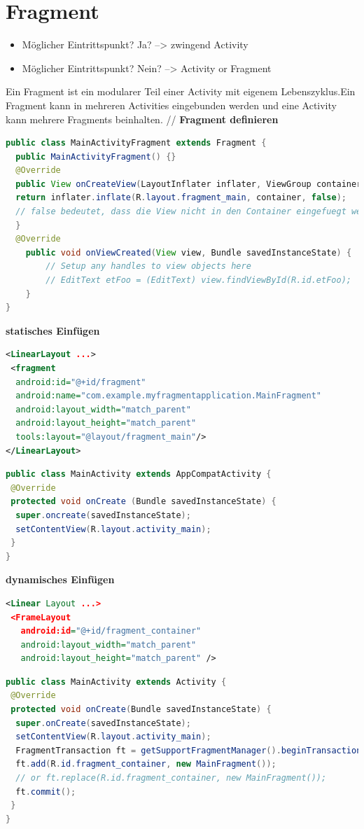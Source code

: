 \section{Fragment}
\begin{itemize}
    \item Möglicher Eintrittspunkt? Ja? --> zwingend Activity
    \item Möglicher Eintrittspunkt? Nein? --> Activity or Fragment
\end{itemize}
Ein Fragment ist ein modularer Teil einer Activity mit eigenem Lebenszyklus.Ein Fragment kann in mehreren Activities eingebunden werden und eine Activity kann mehrere Fragments beinhalten. //
\textbf{Fragment definieren}
\begin{lstlisting}[language=java]
public class MainActivityFragment extends Fragment {
  public MainActivityFragment() {}
  @Override
  public View onCreateView(LayoutInflater inflater, ViewGroup container, Bundle savedInstanceState) {
  return inflater.inflate(R.layout.fragment_main, container, false);
  // false bedeutet, dass die View nicht in den Container eingefuegt werden soll, da das bereits das Fragment macht
  }
  @Override
    public void onViewCreated(View view, Bundle savedInstanceState) {
        // Setup any handles to view objects here
        // EditText etFoo = (EditText) view.findViewById(R.id.etFoo);
    }   
}
\end{lstlisting}
\textbf{statisches Einfügen}
\begin{lstlisting}[language=xml]
<LinearLayout ...>
 <fragment
  android:id="@+id/fragment"
  android:name="com.example.myfragmentapplication.MainFragment"
  android:layout_width="match_parent"
  android:layout_height="match_parent"
  tools:layout="@layout/fragment_main"/>
</LinearLayout> 
\end{lstlisting}
\begin{lstlisting}[language=java]
public class MainActivity extends AppCompatActivity {
 @Override
 protected void onCreate (Bundle savedInstanceState) {
  super.oncreate(savedInstanceState);
  setContentView(R.layout.activity_main);
 }
}
\end{lstlisting}

\textbf{dynamisches Einfügen}
\begin{lstlisting}[language=xml]
<Linear Layout ...>
 <FrameLayout
   android:id="@+id/fragment_container"
   android:layout_width="match_parent"
   android:layout_height="match_parent" />
\end{lstlisting}
\begin{lstlisting}[language=java]
public class MainActivity extends Activity {
 @Override
 protected void onCreate(Bundle savedInstanceState) {
  super.onCreate(savedInstanceState);
  setContentView(R.layout.activity_main);
  FragmentTransaction ft = getSupportFragmentManager().beginTransaction();
  ft.add(R.id.fragment_container, new MainFragment());
  // or ft.replace(R.id.fragment_container, new MainFragment()); 
  ft.commit();
 }
}
\end{lstlisting}

